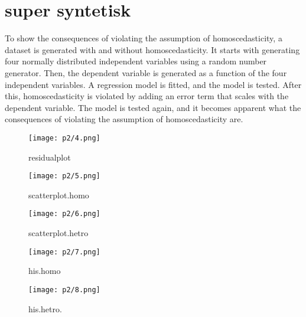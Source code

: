 \section{super syntetisk }

To show the consequences of violating the assumption of homoscedasticity, a dataset is generated with and without homoscedasticity. It starts with generating four normally distributed independent variables using a random number generator. Then, the dependent variable is generated as a function of the four independent variables. A regression model is fitted, and the model is tested. After this, homoscedasticity is violated by adding an error term that scales with the dependent variable. The model is tested again, and it becomes apparent what the consequences of violating the assumption of homoscedasticity are.

%



\begin{figure}[h] 
	\centering\texttt{[image: p2/4.png]}
	\caption{residualplot}
	\label{fig:j06}
\end{figure}

\begin{figure}[h] 
	\centering\texttt{[image: p2/5.png]}
	\caption{scatterplot.homo}
	\label{fig:j06}
\end{figure}

\begin{figure}[h] 
	\centering\texttt{[image: p2/6.png]}
	\caption{scatterplot.hetro}
	\label{fig:j06}
\end{figure}

\begin{figure}[h] 
	\centering\texttt{[image: p2/7.png]}
	\caption{his.homo}
	\label{fig:j06}
\end{figure}

\begin{figure}[h] 
	\centering
	\texttt{[image: p2/8.png]}
	\caption{his.hetro.}
	\label{fig:j06}
\end{figure}



%


